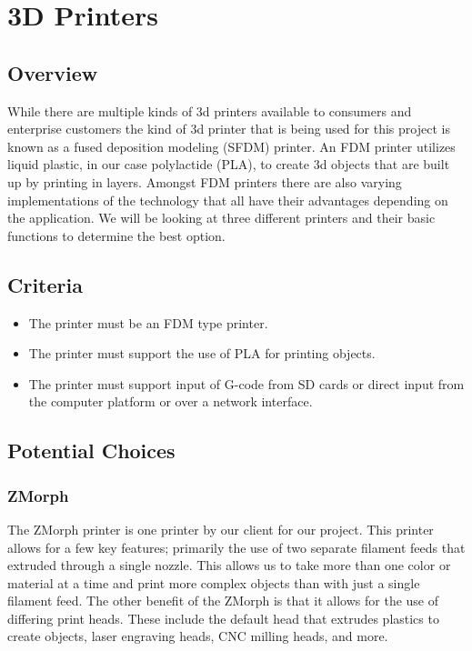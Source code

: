 \documentclass[letterpaper, onecolumn, draftclsnofoot, 10pt, compsoc]{IEEEtran}
\begin{document}
\section{3D Printers}
\subsection{Overview}
	\begin{singlespacing}
	While there are multiple kinds of 3d printers available to consumers and enterprise customers the kind of 3d printer that is being used for this project is known as a fused deposition modeling (SFDM) printer. An FDM printer utilizes liquid plastic, in our case polylactide (PLA), to create 3d objects that are built up by printing in layers. Amongst FDM printers there are also varying implementations of the technology that all have their advantages depending on the application. We will be looking at three different printers and their basic functions to determine the best option. 
	\end{singlespacing} 
\subsection{Criteria}
  \begin{singlespacing}
  \begin{itemize}
      \item The printer must be an FDM type printer.
      \item The printer must support the use of PLA for printing objects.
      \item The printer must support input of G-code from SD cards or direct input from the computer platform or over a network interface.
    \end{itemize}
  \end{singlespacing}
\subsection{Potential Choices}
\subsubsection{ZMorph}
	\begin{singlespacing}
	The ZMorph printer is one printer by our client for our project. This printer allows for a few key features; primarily the use of two separate filament feeds that extruded through a single nozzle. This allows us to take more than one color or material at a time and print more complex objects than with just a single filament feed. The other benefit of the ZMorph is that it allows for the use of differing print heads. These include the default head that extrudes plastics to create objects, laser engraving heads, CNC milling heads, and more.\cite{zmorphtools}
    \end{singlespacing}
\end{document}
